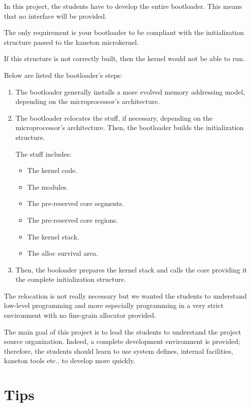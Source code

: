 In this project, the students have to develop the entire bootloader.
This means that no interface will be provided.

The only requirement is your bootloader to be compliant with the
initialization structure passed to the kaneton microkernel.

If this structure is not correctly built, then the kernel would not
be able to run.

Below are listed the bootloader's steps:

\begin{enumerate}
  \item
    The bootloader generally installs a more evolved memory addressing model,
    depending on the microprocessor's architecture.
  \item
    The bootloader relocates the stuff, if necessary, depending on the
    microprocessor's architecture. Then, the bootloader builds the
    initialization structure.

    The stuff includes:

    \begin{itemize}
      \item
	The kernel code.
      \item
	The modules.
      \item
	The pre-reserved core segments.
      \item
	The pre-reserved core regions.
      \item
	The kernel stack.
      \item
	The alloc survival area.
    \end{itemize}
  \item
    Then, the booloader prepares the kernel stack and calls the core
    providing it the complete initialization structure.
\end{enumerate}

The relocation is not really necessary but we wanted the students
to understand low-level programming and more especially programming
in a very strict environment with no fine-grain allocator provided.

The main goal of this project is to lead the students to understand the
project source organization. Indeed, a complete development environment
is provided; therefore, the students should learn to use system defines,
internal facilities, kaneton tools etc.. to develop more quickly.

%
%

\section{Tips}

